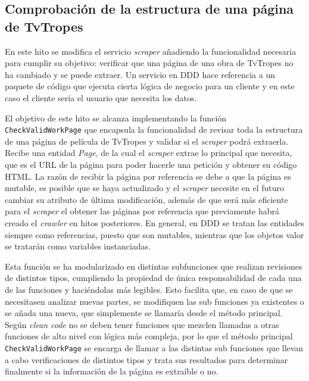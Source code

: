 \subsection{Comprobación de la estructura de una página de TvTropes}
En este hito se modifica el servicio \textit{scraper} añadiendo la funcionalidad
necesaria para cumplir su objetivo: verificar que una página de una obra de
TvTropes no ha cambiado y se puede extraer. Un servicio en DDD hace referencia a
un paquete de código que ejecuta cierta lógica de negocio para un cliente y en
este caso el cliente sería el usuario que necesita los datos. 

El objetivo de este hito se alcanza implementando la función \texttt{CheckValidWorkPage} que encapsula la funcionalidad de revisar toda la
estructura de una página de película de TvTropes y validar si el
\textit{scraper} podrá extraerla. Recibe una entidad \textit{Page}, de la cual
el \textit{scraper} extrae lo principal que necesita, que es el URL de la página
para poder hacerle una petición y obtener su código HTML. La razón de recibir la
página por referencia se debe a que la página es mutable, es posible que se haya
actualizado y el \textit{scraper} necesite en el futuro cambiar su atributo de
última modificación, además de que será más eficiente para el \textit{scraper}
el obtener las páginas por referencia que previamente habrá creado el
\textit{crawler} en hitos posteriores. En general, en DDD se tratan las
entidades siempre como referencias, puesto que son mutables, mientras que los
objetos valor se tratarán como variables instanciadas. 

Esta función se ha modularizado en distintas subfunciones que realizan
revisiones de distintos tipos, cumpliendo la propiedad de única responsabilidad
de cada una de las funciones y haciéndolas más legibles. Esto facilita que, en
caso de que se necesitasen analizar nuevas partes, se modifiquen las sub
funciones ya existentes o se añada una nueva, que simplemente se llamaría desde
el método principal. Según \textit{clean code} no se deben tener funciones que
mezclen llamadas a otras funciones de alto nivel con lógica más compleja, por lo
que el método principal \texttt{CheckValidWorkPage} se encarga de llamar a las
distintas sub funciones que llevan a cabo verificaciones de distintos tipos y
trata sus resultados para determinar finalmente si la información de la página
es extraíble o no.

